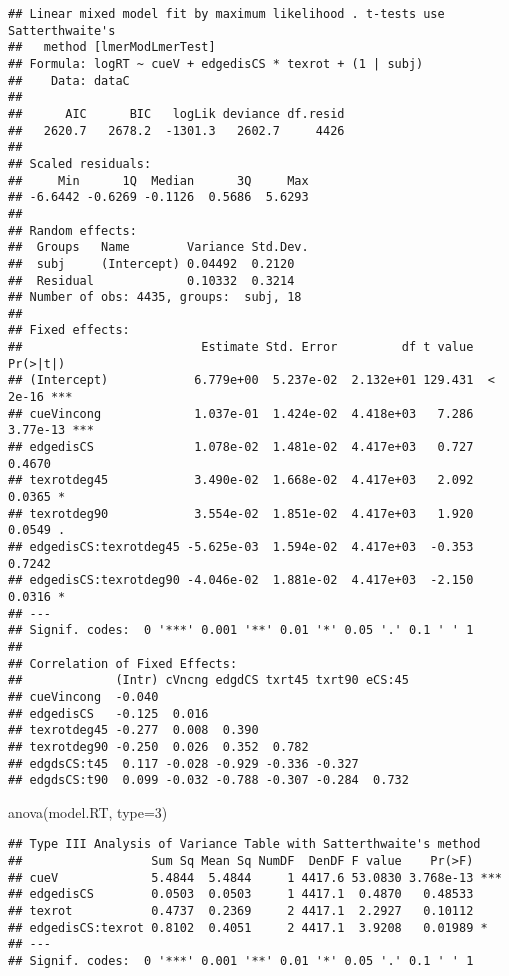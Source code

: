 \documentclass[
]{article}
\newenvironment{Shaded}{\begin{snugshade}}{\end{snugshade}}
\newcommand{\AttributeTok}[1]{\textcolor[rgb]{0.77,0.63,0.00}{#1}}
\newcommand{\DecValTok}[1]{\textcolor[rgb]{0.00,0.00,0.81}{#1}}
\newcommand{\FunctionTok}[1]{\textcolor[rgb]{0.00,0.00,0.00}{#1}}
\newcommand{\NormalTok}[1]{#1}
\begin{document}
\begin{verbatim}
## Linear mixed model fit by maximum likelihood . t-tests use Satterthwaite's
##   method [lmerModLmerTest]
## Formula: logRT ~ cueV + edgedisCS * texrot + (1 | subj)
##    Data: dataC
## 
##      AIC      BIC   logLik deviance df.resid 
##   2620.7   2678.2  -1301.3   2602.7     4426 
## 
## Scaled residuals: 
##     Min      1Q  Median      3Q     Max 
## -6.6442 -0.6269 -0.1126  0.5686  5.6293 
## 
## Random effects:
##  Groups   Name        Variance Std.Dev.
##  subj     (Intercept) 0.04492  0.2120  
##  Residual             0.10332  0.3214  
## Number of obs: 4435, groups:  subj, 18
## 
## Fixed effects:
##                         Estimate Std. Error         df t value Pr(>|t|)    
## (Intercept)            6.779e+00  5.237e-02  2.132e+01 129.431  < 2e-16 ***
## cueVincong             1.037e-01  1.424e-02  4.418e+03   7.286 3.77e-13 ***
## edgedisCS              1.078e-02  1.481e-02  4.417e+03   0.727   0.4670    
## texrotdeg45            3.490e-02  1.668e-02  4.417e+03   2.092   0.0365 *  
## texrotdeg90            3.554e-02  1.851e-02  4.417e+03   1.920   0.0549 .  
## edgedisCS:texrotdeg45 -5.625e-03  1.594e-02  4.417e+03  -0.353   0.7242    
## edgedisCS:texrotdeg90 -4.046e-02  1.881e-02  4.417e+03  -2.150   0.0316 *  
## ---
## Signif. codes:  0 '***' 0.001 '**' 0.01 '*' 0.05 '.' 0.1 ' ' 1
## 
## Correlation of Fixed Effects:
##             (Intr) cVncng edgdCS txrt45 txrt90 eCS:45
## cueVincong  -0.040                                   
## edgedisCS   -0.125  0.016                            
## texrotdeg45 -0.277  0.008  0.390                     
## texrotdeg90 -0.250  0.026  0.352  0.782              
## edgdsCS:t45  0.117 -0.028 -0.929 -0.336 -0.327       
## edgdsCS:t90  0.099 -0.032 -0.788 -0.307 -0.284  0.732
\end{verbatim}

\begin{Shaded}
\begin{Highlighting}[]
\FunctionTok{anova}\NormalTok{(model.RT, }\AttributeTok{type=}\DecValTok{3}\NormalTok{)}
\end{Highlighting}
\end{Shaded}

\begin{verbatim}
## Type III Analysis of Variance Table with Satterthwaite's method
##                  Sum Sq Mean Sq NumDF  DenDF F value    Pr(>F)    
## cueV             5.4844  5.4844     1 4417.6 53.0830 3.768e-13 ***
## edgedisCS        0.0503  0.0503     1 4417.1  0.4870   0.48533    
## texrot           0.4737  0.2369     2 4417.1  2.2927   0.10112    
## edgedisCS:texrot 0.8102  0.4051     2 4417.1  3.9208   0.01989 *  
## ---
## Signif. codes:  0 '***' 0.001 '**' 0.01 '*' 0.05 '.' 0.1 ' ' 1
\end{verbatim}
\end{document}
